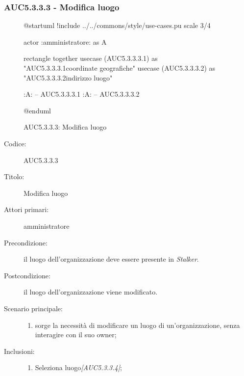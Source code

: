 \documentclass[../analisi-dei-requisiti.tex]{subfiles}
\begin{document}
\subsubsection{AUC5.3.3.3 - Modifica luogo}%
\label{subsub:AUC5.3.3.3}

\begin{figure}[h!]
  \centering
  \begin{plantuml}
  @startuml
  !include ../../commons/style/use-cases.pu
  scale 3/4

  actor :amministratore: as A

  rectangle {
    together {
      usecase (AUC5.3.3.3.1) as "AUC5.3.3.3.1\nModifica coordinate geografiche"
      usecase (AUC5.3.3.3.2) as "AUC5.3.3.3.2\nModifica indirizzo luogo"
    }
  }

  :A: -- AUC5.3.3.3.1
  :A: -- AUC5.3.3.3.2

  @enduml
  \end{plantuml}
  \caption{AUC5.3.3.3: Modifica luogo}
  \label{fig:AUC5_3_3_3}
\end{figure}

\begin{description}
  \item[Codice:] AUC5.3.3.3
  \item[Titolo:] Modifica luogo
  \item[Attori primari:] amministratore
  \item[Precondizione:] il luogo dell'organizzazione deve essere presente in \emph{Stalker}.
  \item[Postcondizione:] il luogo dell'organizzazione viene modificato.
  \item[Scenario principale:]
  \begin{enumerate}
    \item sorge la necessità di modificare un luogo di un'organizzazione, senza interagire con il suo owner;
  \end{enumerate}
  \item[Inclusioni:]
  \begin{enumerate}
    \item Seleziona luogo\emph{[AUC5.3.3.4]};
  \end{enumerate}
\end{description}
\end{document}
